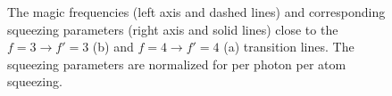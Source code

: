 \begin{figure}[!tbp]
\begin{minipage}{.91\linewidth}
\centering
{}
\end{minipage}
\par\medskip
\begin{minipage}{.91\linewidth}
\centering
{}
\end{minipage}
\caption[Magic frequencies and spin squeezing including the tensor interactions.]{The magic frequencies (left axis and dashed lines) and corresponding squeezing parameters 
(right axis and solid lines) close to the $ 
f=3\rightarrow f'=3 $ (b) and $ f=4\rightarrow f'=4 $ (a) transition lines. The squeezing parameters are 
normalized for per photon per atom squeezing. }\label{fig:MagicwavelengSqueezingpara}
\end{figure}

